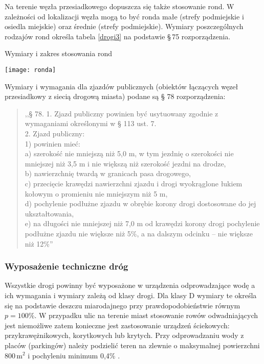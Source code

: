\documentclass[twoside,12pt]{article}
\begin{document}
	Na terenie węzła przesiadkowego dopuszcza się także stosowanie rond. W zależności od lokalizacji węzła mogą to być ronda małe (strefy podmiejskie i osiedla miejskie) oraz średnie (strefy podmiejskie). Wymiary poszczególnych rodzajów rond określa tabela \ref{drogi3} na podstawie §\,75 rozporządzenia.
		\begin{table}[H]
		\centering
		\caption{Wymiary i zakres stosowania rond}
		\texttt{[image: ronda]}\\
		\label{drogi3}
	\end{table}	
	
	Wymiary i wymagania dla zjazdów publicznych (obiektów łączących węzeł przesiadkowy z siecią drogową miasta) podane są § 78 rozporządzenia:
	\begin{quote}
	,,§ 78. 1. Zjazd publiczny powinien być usytuowany zgodnie z wymaganiami określonymi w § 113 ust. 7.\\
2. Zjazd publiczny:\\
1) powinien mieć:\\
a) szerokość nie mniejszą niż 5,0 m, w tym jezdnię o szerokości nie mniejszej niż 3,5 m i nie większą niż szerokość
jezdni na drodze,\\
b) nawierzchnię twardą w granicach pasa drogowego,\\
c) przecięcie krawędzi nawierzchni zjazdu i drogi wyokrąglone łukiem kołowym o promieniu nie mniejszym niż 5 m,\\
d) pochylenie podłużne zjazdu w obrębie korony drogi dostosowane do jej ukształtowania,\\
e) na długości nie mniejszej niż 7,0 m od krawędzi korony drogi pochylenie podłużne zjazdu nie większe niż 5\%,
a na dalszym odcinku – nie większe niż 12\%'' \cite{rozporzadzenie_drogi}
	\end{quote}
	
	\subsubsection{Wyposażenie techniczne dróg} 

	Wszystkie drogi powinny być wyposażone w urządzenia odprowadzające wodę a ich wymagania i wymiary zależą od klasy drogi. Dla klasy D wymiary te określa się na podstawie deszczu miarodajnego przy prawdopodobieństwie równym $p=100\%$. W przypadku ulic na terenie miast stosowanie rowów odwadniających jest niemożliwe zatem konieczne jest zastosowanie urządzeń ściekowych: przykrawężnikowych, korytkowych lub krytych. Przy odprowadzaniu wody z placów (parkingów) należy podzielić teren na zlewnie o maksymalnej powierzchni 800\,m$^2$ i pochyleniu minimum 0,4\% \cite{rozporzadzenie_drogi}.
	
\end{document}

